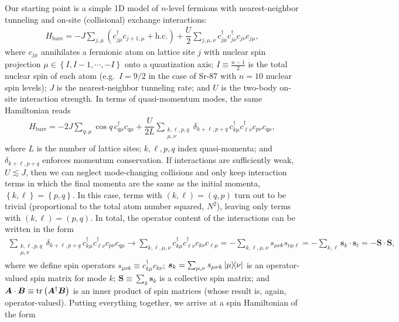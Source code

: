 \documentclass[nofootinbib,notitlepage,11pt]{revtex4-2}
\renewcommand{\t}{\text} %
\newcommand{\f}[2]{\dfrac{#1}{#2}} %
\newcommand{\p}[1]{\left(#1\right)} %
\renewcommand{\set}[1]{\left\{#1\right\}} %
\renewcommand{\v}{\bm} %
\renewcommand{\c}{\cdot} %
\newcommand{\1}{\mathds{1}}
\begin{document}
Our starting point is a simple 1D model of $n$-level fermions with nearest-neighbor tunneling and on-site (collisional) exchange interactions:
\begin{align}
  H_{\t{bare}} = -J \sum_{j,\mu}
  \p{c_{j\mu}^\dag c_{j+1,\mu} + \t{h.c.}}
  + \f{U}{2} \sum_{j,\mu,\nu} c_{j\mu}^\dag c_{j\nu}^\dag c_{j\nu} c_{j\mu},
  \label{eq:bare_sites}
\end{align}
where $c_{j\mu}$ annihilates a fermionic atom on lattice site $j$ with nuclear spin projection $\mu\in\set{I,I-1,\cdots,-I}$ onto a quantization axis; $I\equiv\frac{n-1}{2}$ is the total nuclear spin of each atom (e.g.~$I=9/2$ in the case of Sr-87 with $n=10$ nuclear spin levels); $J$ is the nearest-neighbor tunneling rate; and $U$ is the two-body on-site interaction strength.
In terms of quasi-momentum modes, the same Hamiltonian reads
\begin{align}
  H_{\t{bare}} = -2J \sum_{q,\mu} \cos q\, c_{q\mu}^\dag c_{q\mu}
  + \f{U}{2L} \sum_{\substack{k,\ell,p,q\\\mu,\nu}}
  \delta_{k+\ell,p+q}\, c_{k\mu}^\dag c_{\ell\nu}^\dag c_{p\nu} c_{q\mu},
  \label{eq:bare_momenta}
\end{align}
where $L$ is the number of lattice sites; $k,\ell,p,q$ index quasi-momenta; and $\delta_{k+\ell,p+q}$ enforces momentum conservation.
If interactions are sufficiently weak, $U\lesssim J$, then we can neglect mode-changing collisions and only keep interaction terms in which the final momenta are the same as the initial momenta, $\set{k,\ell}=\set{p,q}$.
In this case, terms with $\p{k,\ell}=\p{q,p}$ turn out to be trivial (proportional to the total atom number squared, $N^2$), leaving only terms with $\p{k,\ell}=\p{p,q}$.
In total, the operator content of the interactions can be written in the form
\begin{align}
  \sum_{\substack{k,\ell,p,q\\\mu,\nu}}
  \delta_{k+\ell,p+q}\, c_{k\mu}^\dag c_{\ell\nu}^\dag c_{p\nu} c_{q\mu}
  \to \sum_{k,\ell,\mu,\nu} c_{k\mu}^\dag c_{\ell\nu}^\dag
  c_{k\nu} c_{\ell\mu}
  = -\sum_{k,\ell,\mu,\nu} s_{\mu\nu k} s_{\nu\mu\ell}
  = -\sum_{k,\ell} \v s_k \c\v s_\ell
  = -\v S \c\v S,
\end{align}
where we define spin operators $s_{\mu\nu k}\equiv c_{k\mu}^\dag c_{k\nu}$; $\v s_k=\sum_{\mu,\nu}s_{\mu\nu k}\op{\mu}{\nu}$ is an operator-valued spin matrix for mode $k$; $\v S\equiv\sum_k \v s_k$ is a collective spin matrix; and $\v A\c\v B\equiv\tr\p{\v A^\dag \v B}$ is an inner product of spin matrices (whose result is, again, operator-valued).  Putting everything together, we arrive at a spin Hamiltonian of the form
\end{document}
